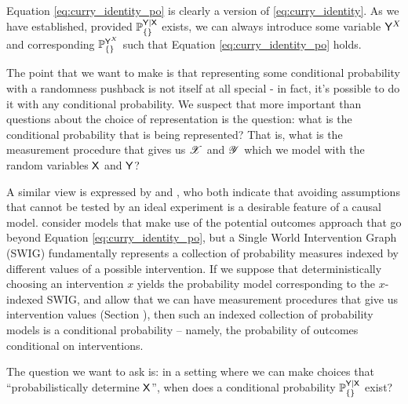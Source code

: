Equation \ref{eq:curry_identity_po} is clearly a version of \ref{eq:curry_identity}. As we have established, provided $\mathbb{P}_{\{\}}^{\mathsf{Y}|\mathsf{X}}$ exists, we can always introduce some variable $\mathsf{Y}^X$ and corresponding $\mathbb{P}_{\{\}}^{\mathsf{Y}^X}$ such that Equation \ref{eq:curry_identity_po} holds.

The point that we want to make is that representing some conditional probability with a randomness pushback is not itself at all special - in fact, it's possible to do it with any conditional probability. We suspect that more important than questions about the choice of representation is the question: what is the conditional probability that is being represented? That is, what is the measurement procedure that gives us $\mathscr{X}$ and $\mathscr{Y}$ which we model with the random variables $\mathsf{X}$ and $\mathsf{Y}$?

A similar view is expressed by \citet{dawid_causal_2000} and \citet{richardson2013single}, who both indicate that avoiding assumptions that cannot be tested by an ideal experiment is a desirable feature of a causal model. \citet{richardson2013single} consider models that make use of the potential outcomes approach that go beyond Equation \ref{eq:curry_identity_po}, but a Single World Intervention Graph (SWIG) fundamentally represents a collection of probability measures indexed by different values of a possible intervention. If we suppose that deterministically choosing an intervention $x$ yields the probability model corresponding to the $x$-indexed SWIG, and allow that we can have measurement procedures that give us intervention values (Section \label{sec:actions}), then such an indexed collection of probability models is a conditional probability -- namely, the probability of outcomes conditional on interventions.

The question we want to ask is: in a setting where we can make choices that ``probabilistically determine $\mathsf{X}$'', when does a conditional probability $\mathbb{P}_{\{\}}^{\mathsf{Y}|\mathsf{X}}$ exist?
